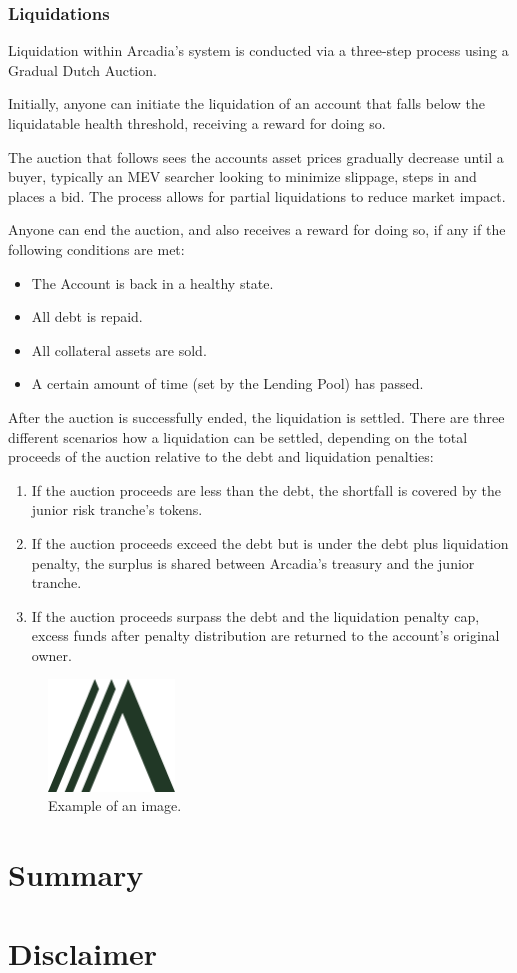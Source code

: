 \documentclass[sigconf,nonacm]{acmart}
\begin{document}
\subsubsection{Liquidations}
\label{subsubsec:liquidations}
Liquidation within Arcadia's system is conducted via a three-step process using a Gradual Dutch Auction.

Initially, anyone can initiate the liquidation of an account that falls below the liquidatable health threshold,
receiving a reward for doing so.

The auction that follows sees the accounts asset prices gradually decrease until a buyer,
typically an MEV searcher looking to minimize slippage, steps in and places a bid.
The process allows for partial liquidations to reduce market impact.

Anyone can end the auction, and also receives a reward for doing so, if any if the following conditions are met:
\begin{itemize}
    \item The Account is back in a healthy state.
    \item All debt is repaid.
    \item All collateral assets are sold.
    \item A certain amount of time (set by the Lending Pool) has passed.
\end{itemize}

After the auction is successfully ended, the liquidation is settled.
There are three different scenarios how a liquidation can be settled,
depending on the total proceeds of the auction relative to the debt and liquidation penalties:
\begin{enumerate}
    \item If the auction proceeds are less than the debt,
    the shortfall is covered by the junior risk tranche's tokens.
    \item If the auction proceeds exceed the debt but is under the debt plus liquidation penalty,
    the surplus is shared between Arcadia's treasury and the junior tranche.
    \item If the auction proceeds surpass the debt and the liquidation penalty cap,
    excess funds after penalty distribution are returned to the account's original owner.
\end{enumerate}


\begin{figure}
    \label{fig:arcadia-logo}
    \centering
    \includegraphics[width=0.3\textwidth]{images/Logo-Arcadia.png}
    \caption{Example of an image.}
  \end{figure}

\section{Summary}
\lipsum[7]




\section*{Disclaimer}
\lipsum[8]
\end{document}
